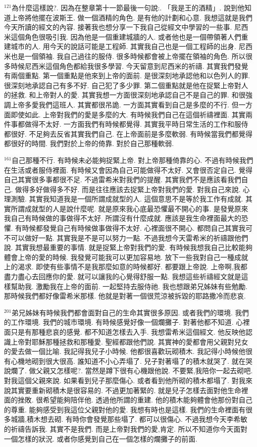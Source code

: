 \documentclass{book}
\begin{document}
$^{121}$為什麼這樣說?.
因為在整章第十一節最後一句說:.
「我是王的酒精」.
說到他知道上帝將他擺在波斯王.
做一個酒精的角色.
是有他的計劃和心意.
我想這就是我們今天所讀的經文的內容.
接著我也想分享一下我自己從經文中學習的一些事.
尼西米這個角色很吸引我.
因為他是一個重建城牆的人.
或者他也是一個帶領著人們重建城市的人.
用今天的說話可能是工程師.
其實我自己也是一個工程師的出身.
尼西米也是一個領袖.
我自己過往的服侍.
很多時候都會被上帝擺在領袖的角色.
所以很多時候尼西米這個角色都給我很多學習.
今天留意到尼西米的祈禱.
其實我們發覺有兩個重點.
第一個重點是他來到上帝的面前.
是很深刻地承認他和以色列人的罪.
很深刻地承認自己有多不好.
自己犯了多少罪.
第二個重點就是他在捉緊上帝對人的拯救.
和上帝對人的愛.
其實我想一方面很深刻地承認自己不是自己的罪.
和很強調上帝多愛我們這班人.
其實都很吊詭.
一方面其實看到自己是多麼的不行.
但一方面即使如此.
上帝對我們的愛是多麼的大.
有時候我們自己在這個祈禱裡面.
其實兩件事都做得不太好.
一方面我們有時候都覺得.
其實我平時日常生活的工作和服侍都很好.
不足夠去反省其實我們自己.
在上帝面前是多麼軟弱.
有時候當我們都覺得都很好的時間.
我們對於上帝的倚靠.
對於自己那種軟弱.

$^{161}$自己那種不行.
有時候未必能夠捉緊上帝.
對上帝那種倚靠的心.
不過有時候我們在生活或者服侍裡面.
有時候又會因為自己可能做得不太好.
又會很否定自己.
覺得自己其實很多事都很不足.
不過雷希米對我們的提醒.
其實我們不是應該看我們自己.
做得多好做得多不好.
而是往往應該去捉緊上帝對我們的愛.
對我自己來說.
心理測驗.
其實我知道我是一個所謂成就型的人.
這個意思不是等於我工作有成就.
其實所謂成就型的人是說什麼呢.
就是原來我心底最恐懼最不開心的事.
是發覺原來我自己有時候做的事做得不太好.
所謂沒有什麼成就.
應該是我生命裡面最大的恐懼.
有時候都發覺自己有時候做事做得不太好.
心裡面很不開心.
都問自己其實我可不可以做好一點.
其實我是不是可以努力一點.
不過我想今天雷希米的祈禱跟他們說.
其實我想最重要的事情.
就是捉緊上帝對我們的愛.
有時候我想我自己比較能夠體會上帝的愛的時候.
我發覺可能我可以更加容易地.
放下一些我對自己一種成就上的渴求.
即使有些事情不是我那麼如意的時候都好.
都要跟上帝說.
上帝啊,我都盡力盡心去回應你的愛.
就可以讓我的心覺得舒服一點.
我想這些祈禱經文就是這樣幫助我.
激勵我在上帝的面前.
一起堅持去服侍祂.
我也想跟弟兄姊妹有些勉勵.
那時候我們都好像雷希米那樣.
他就是對著一個很荒涼被拆毀的耶路撒冷而悲哀.

$^{201}$弟兄姊妹有時候我們都會面對自己的生命其實很多原因.
或者我們的環境.
我們的工作環境.
我們的城市環境.
有時候感覺好像一個爛攤子.
對著他都不知道.
心裡面只是有那種悲哀的感覺.
都不知道怎樣去入手.
我想雷希米這個經文.
他反映他認識上帝對耶穌那種拯救和那種愛.
聖經都跟他們說.
其實神的愛都會用父親對兒女的愛去做一個比喻.
我記得我兒子小時候.
他都很喜歡玩砌積木.
我記得小時候他很有心機地砌到很大很高.
誰知道不小心弄塌了.
兒子對著塌了的積木就哭了.
就在哭說爛了.
做父親又怎樣呢?.
當然是蹲下很有心機跟他說.
不要緊,我陪你一起去砌吧.
對我這個父親來說.
如果看到兒子那麼傷心.
或者看到他所砌的積木都塌了.
對我來說其實要重新砌積木是很容易的.
不過更加著緊的.
就是兒子怎樣去面對他生命裡面的挫敗.
很希望能夠陪伴他.
透過他所謂的重建.
他的積木能夠體會他那份對自己的尊重.
能夠感受到我這位父親對他的愛.
我想有時也是這樣.
我們的生命裡面有很多城牆,積木想去砌.
有時你會發覺那些塌了.
都可以很傷心.
不過我想今天李希敏的祈禱告訴我.
其實不是我們.
而是上帝對我們的愛,肯定.
所以不知道你今天面對一個怎樣的狀況.
或者你感覺到自己在一個怎樣的爛攤子的前面.
\end{document}
